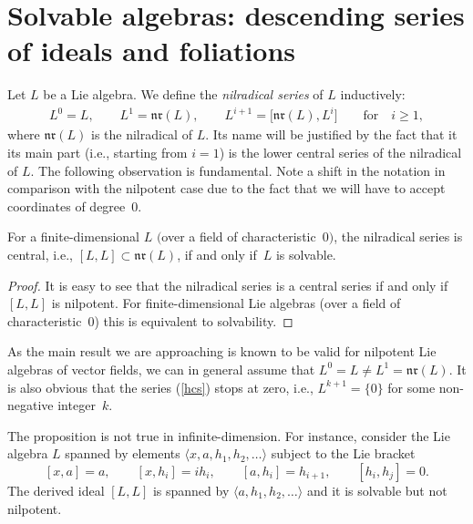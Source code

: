 \section{Solvable algebras: descending series of ideals and foliations}
Let $L$ be a Lie algebra. We define the \emph{nilradical series} of $L$ inductively:
\begin{gather}\label{hcs} L^0=L ,\qquad L^1=\mathfrak{nr}(L) , \qquad L^{i+1}=\big[\mathfrak{nr}(L),L^i\big]\qquad \text{for}\quad i\ge 1 ,
\end{gather}
where $\mathfrak{nr}(L)$ is the nilradical of $L$.
Its name will be justified by the fact that it its main part (i.e., starting from $i=1$) is the lower central series of the nilradical of $L$. The following observation is fundamental. Note a shift in the notation in comparison with the nilpotent case due to the fact that we will have to accept coordinates of degree~$0$.
\begin{Proposition}
For a finite-dimensional $L$ $($over a field of characteristic~$0)$, the nilradical series is central, i.e., $[L,L]\subset\mathfrak{nr}(L)$, if and only if~$L$ is solvable.
\end{Proposition}
\begin{proof}
It is easy to see that the nilradical series is a central series if and only if $[L,L]$ is nilpotent. For finite-dimensional Lie algebras (over a field of characteristic~$0$) this is equivalent to solvability.
\end{proof}
\begin{Remark}
As the main result we are approaching is known to be valid for nilpotent Lie algebras of vector fields, we can in general assume that $L^0=L\ne L^1=\mathfrak{nr}(L)$. It is also obvious that the series (\ref{hcs}) stops at zero, i.e., $L^{k+1}=\{ 0\}$ for some non-negative integer~$k$.
\end{Remark}
\begin{Example} The proposition is not true in infinite-dimension. For instance, consider the Lie algebra $L$ spanned by elements $\langle x,a,h_1,h_2,\dots\rangle$ subject to the Lie bracket
\[ [x,a]=a ,\qquad [x,h_i]=ih_i ,\qquad [a,h_i]=h_{i+1} ,\qquad [h_i,h_j]=0 .\]
The derived ideal $[L,L]$ is spanned by $\langle a,h_1,h_2,\dots\rangle$ and it is solvable but not nilpotent.
\end{Example}

